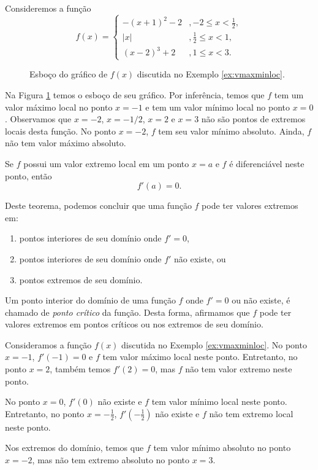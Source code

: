 \begin{ex}\label{ex:vmaxminloc}
  Consideremos a função
  \begin{equation}
    f(x) = \left\{
      \begin{array}{ll}
        -(x+1)^2-2 &, -2\leq x < \frac{1}{2},\\
        |x| &, \frac{1}{2} \leq x < 1,\\
        (x-2)^3+2 &, 1\leq x < 3.
      \end{array}
\right.
\end{equation}

  \begin{figure}[H]
    \centering
    \caption{Esboço do gráfico de $f(x)$ discutida no Exemplo \ref{ex:vmaxminloc}.}
    \label{fig:ex_vmaxminloc}
  \end{figure}
  
Na Figura \ref{fig:ex_vmaxminloc} temos o esboço de seu gráfico. Por inferência, temos que $f$ tem um valor máximo local no ponto $x=-1$ e tem um valor mínimo local no ponto $x=0$. Observamos que $x=-2$, $x=-1/2$, $x=2$ e $x=3$ não são pontos de extremos locais desta função. No ponto $x=-2$, $f$ tem seu valor mínimo absoluto. Ainda, $f$ não tem valor máximo absoluto.
\end{ex}

\begin{teo}
  Se $f$ possui um valor extremo local em um ponto $x=a$ e $f$ é diferenciável neste ponto, então
  \begin{equation}
    f'(a) = 0.
  \end{equation}
\end{teo}

Deste teorema, podemos concluir que uma função $f$ pode ter valores extremos em:
\begin{enumerate}
\item pontos interiores de seu domínio onde $f' = 0$,
\item pontos interiores de seu domínio onde $f'$ não existe, ou
\item pontos extremos de seu domínio.
\end{enumerate}
Um ponto interior do domínio de uma função $f$ onde $f'=0$ ou não existe, é chamado de \emph{ponto crítico} da função. Desta forma, afirmamos que $f$ pode ter valores extremos em pontos críticos ou nos extremos de seu domínio.

\begin{ex}
  Consideramos a função $f(x)$ discutida no Exemplo \ref{ex:vmaxminloc}. No ponto $x=-1$, $f'(-1)=0$ e $f$ tem valor máximo local neste ponto. Entretanto, no ponto $x=2$, também temos $f'(2)=0$, mas $f$ não tem valor extremo neste ponto.

  No ponto $x=0$, $f'(0)$ não existe e $f$ tem valor mínimo local neste ponto. Entretanto, no ponto $x=-\frac{1}{2}$, $f'\left(-\frac{1}{2}\right)$ não existe e $f$ não tem extremo local neste ponto.

  Nos extremos do domínio, temos que $f$ tem valor mínimo absoluto no ponto $x=-2$, mas não tem extremo absoluto no ponto $x=3$.
\end{ex}

